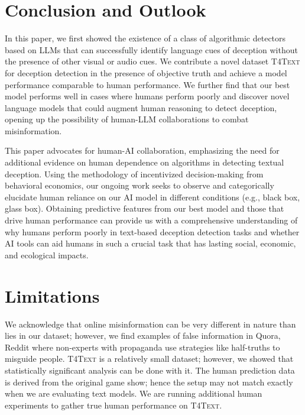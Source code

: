 \section{Conclusion and Outlook}

In this paper, we first showed the existence of a class of algorithmic detectors based on LLMs that can successfully identify language cues of deception without the presence of other visual or audio cues.  We contribute a novel dataset \textsc{T4Text} for deception detection in the presence of objective truth and achieve a model performance comparable to human performance. We further find that our best model performs well in cases where humans perform poorly and discover novel language models that could augment human reasoning to detect deception, opening up the possibility of human-LLM collaborations to combat misinformation.  

This paper advocates for human-AI collaboration, emphasizing the need for additional evidence on human dependence on algorithms in detecting textual deception. Using the methodology of incentivized decision-making from behavioral economics, our ongoing work seeks to observe and categorically elucidate human reliance on our AI model in different conditions (e.g., black box, glass box). Obtaining predictive features from our best model and those that drive human performance can provide us with a comprehensive understanding of why humans perform poorly in text-based deception detection tasks and whether AI tools can aid humans in such a crucial task that has lasting social, economic, and ecological impacts.


\section{Limitations}
We acknowledge that online misinformation can be very different in nature than lies in our dataset; however, we find examples of false information in Quora, Reddit where non-experts with propaganda use strategies like half-truths to misguide people. \textsc{T4Text} is a relatively small dataset; however, we showed that statistically significant analysis can be done with it. The human prediction data is derived from the original game show; hence the setup may not match exactly when we are evaluating text models. We are running additional human experiments to gather true human performance on \textsc{\textsc{T4Text}}. 

